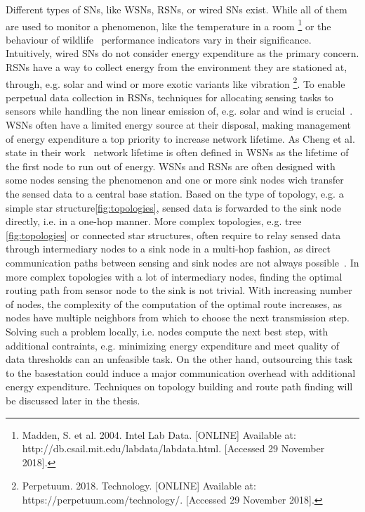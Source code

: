 Different types of \acp{SN}, like \acp{WSN}, \acp{RSN}, or wired \acp{SN} exist. While all of them are used to monitor a phenomenon, like the temperature in a room \footnote{Madden, S. et al. 2004. Intel Lab Data. [ONLINE] Available at: http://db.csail.mit.edu/labdata/labdata.html. [Accessed 29 November 2018].} or the behaviour of wildlife~\cite{bennett2011cranetracker} performance indicators vary in their significance. Intuitively, wired \acp{SN} do not consider energy expenditure as the primary concern. \acp{RSN} have a way to collect energy from the environment they are stationed at, through, e.g. solar and wind or more exotic variants like vibration \footnote{Perpetuum. 2018. Technology. [ONLINE] Available at: https://perpetuum.com/technology/. [Accessed 29 November 2018].}. To enable perpetual data collection in \acp{RSN}, techniques for allocating sensing tasks to sensors while handling the non linear emission of, e.g. solar and wind is crucial~\cite{liu2011perpetual}. \acp{WSN} often have a limited energy source at their disposal, making management of energy expenditure a top priority to increase network lifetime. As Cheng et al. state in their work~\cite{cheng2013stcdg} network lifetime is often defined in \acp{WSN} as the lifetime of the first node to run out of energy. 
\acp{WSN} and \acp{RSN} are often designed with some nodes sensing the phenomenon and one or more sink nodes wich transfer the sensed data to a central base station. Based on the type of topology, e.g. a simple star structure\ref{fig:topologies}, sensed data is forwarded to the sink node directly, i.e. in a one-hop manner. More complex topologies, e.g. tree \ref{fig:topologies} or connected star structures, often require to relay sensed data through intermediary nodes to a sink node in a multi-hop fashion, as direct communication paths between sensing and sink nodes are not always possible~\cite{romer2004design}.
In more complex topologies with a lot of intermediary nodes, finding the optimal routing path from sensor node to the sink is not trivial. 
With increasing number of nodes, the complexity of the computation of the optimal route increases, as nodes have multiple neighbors from which to choose the next transmission step. Solving such a problem locally, i.e. nodes compute the next best step, with additional contraints, e.g. minimizing energy expenditure and meet quality of data thresholds can an unfeasible task. On the other hand, outsourcing this task to the basestation could induce a major communication overhead with additional energy expenditure.
Techniques on topology building and route path finding will be discussed later in the thesis.

